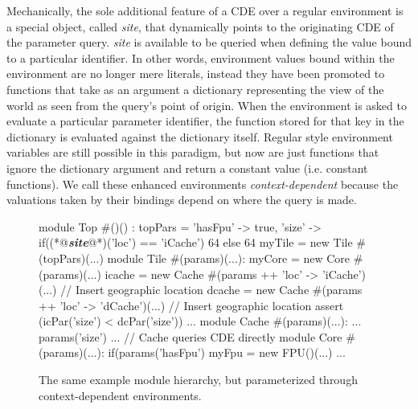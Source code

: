 Mechanically, the sole additional feature of a CDE over a regular environment is a special object, called \emph{site}, that dynamically points to the originating CDE of the parameter query.
\emph{site} is available to be queried when defining the value bound to a particular identifier.
In other words, environment values bound within the environment are no longer mere literals, instead
they have been promoted to functions that take as an argument a dictionary representing the view of the world as seen from the query's point of origin.
When the environment is asked to evaluate a particular parameter identifier, the function stored for that key in the dictionary is evaluated against the dictionary itself.
Regular style environment variables are still possible in this paradigm, but now are just functions that ignore the dictionary argument and return a constant value (i.e. constant functions). 
We call these enhanced environments {\em context-dependent} because the valuations taken by their bindings depend on where the query is made.

\begin{figure}[p]
\centering
\begin{phdl}
module Top #()() :
  topPars = {'hasFpu' -> true,
             'size' -> if((*@\textcolor[rgb]{1,0.5,0}{\textbf{\textit{site}}}@*)('loc') == 'iCache') 64 else 64 }
  myTile = new Tile #(topPars)(...)
module Tile #(params)(...):
  myCore = new Core #(params)(...)
  icache = new Cache #(params ++ {'loc' -> 'iCache'})(...) // Insert geographic location
  dcache = new Cache #(params ++ {'loc' -> 'dCache'})(...) // Insert geographic location
  assert (icPar('size') < dcPar('size')) ...
module Cache #(params)(...):
  ... params('size') ... // Cache queries CDE directly
module Core #(params)(...):
  if(params('hasFpu') myFpu = new FPU()(...) ...
\end{phdl} 
\caption[Parameterizing the example with CDEs.]{The same example module hierarchy, but parameterized through context-dependent environments.}
\label{fig:cde}
\end{figure}


